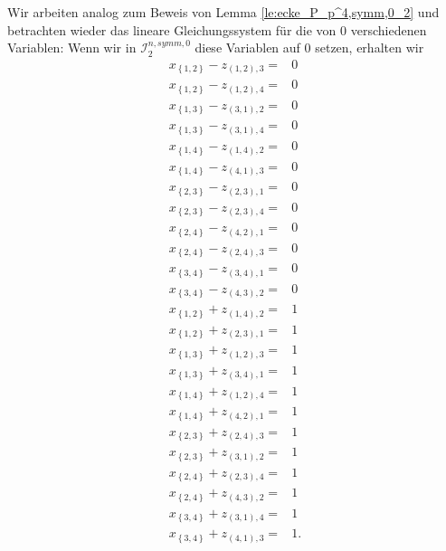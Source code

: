 \documentclass[10p,a4paper,BCOR = 12mm, DIV=15]{scrbook}
\begin{document}
\begin{bew}
Wir arbeiten analog zum Beweis von Lemma \ref{le:ecke_P_p^4,symm,0_2} und betrachten wieder das lineare Gleichungssystem für die von $0$ verschiedenen Variablen:
Wenn wir in $\mathcal{I}^{n, symm, 0}_2$ diese Variablen auf $0$ setzen, erhalten wir
{
\allowdisplaybreaks
\begin{align*}
x_{\left\{1, 2\right\}} - z_{\left(1, 2\right), 3} = & 0 \\
x_{\left\{1, 2\right\}} - z_{\left(1, 2\right), 4} = & 0 \\
x_{\left\{1, 3\right\}} - z_{\left(3, 1\right), 2} = & 0 \\
x_{\left\{1, 3\right\}} - z_{\left(3, 1\right), 4} = & 0 \\
x_{\left\{1, 4\right\}} - z_{\left(1, 4\right), 2} = & 0 \\
x_{\left\{1, 4\right\}} - z_{\left(4, 1\right), 3} = & 0 \\
x_{\left\{2, 3\right\}} - z_{\left(2, 3\right), 1} = & 0 \\
x_{\left\{2, 3\right\}} - z_{\left(2, 3\right), 4} = & 0 \\
x_{\left\{2, 4\right\}} - z_{\left(4, 2\right), 1} = & 0 \\
x_{\left\{2, 4\right\}} - z_{\left(2, 4\right), 3} = & 0 \\
x_{\left\{3, 4\right\}} - z_{\left(3, 4\right), 1} = & 0 \\
x_{\left\{3, 4\right\}} - z_{\left(4, 3\right), 2} = & 0 \\
x_{\left\{1, 2\right\}} + z_{\left(1, 4\right), 2} = & 1 \\
x_{\left\{1, 2\right\}} + z_{\left(2, 3\right), 1} = & 1 \\
x_{\left\{1, 3\right\}} + z_{\left(1, 2\right), 3} = & 1 \\
x_{\left\{1, 3\right\}} + z_{\left(3, 4\right), 1} = & 1 \\
x_{\left\{1, 4\right\}} + z_{\left(1, 2\right), 4} = & 1 \\
x_{\left\{1, 4\right\}} + z_{\left(4, 2\right), 1} = & 1 \\
x_{\left\{2, 3\right\}} + z_{\left(2, 4\right), 3} = & 1 \\
x_{\left\{2, 3\right\}} + z_{\left(3, 1\right), 2} = & 1 \\
x_{\left\{2, 4\right\}} + z_{\left(2, 3\right), 4} = & 1 \\
x_{\left\{2, 4\right\}} + z_{\left(4, 3\right), 2} = & 1 \\
x_{\left\{3, 4\right\}} + z_{\left(3, 1\right), 4} = & 1 \\
x_{\left\{3, 4\right\}} + z_{\left(4, 1\right), 3} = & 1.
\end{align*}
}


\end{bew}
\end{document}
